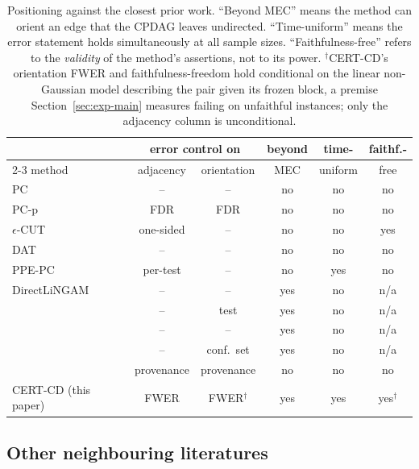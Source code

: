 \documentclass[pdflatex,sn-apa]{sn-jnl}
\theoremstyle{thmstyleone}%
\theoremstyle{thmstyletwo}%
\theoremstyle{thmstylethree}%
\begin{document}
\begin{table}[t]
\centering
\caption{Positioning against the closest prior work. ``Beyond MEC'' means the
method can orient an edge that the CPDAG leaves undirected. ``Time-uniform'' means the
error statement holds simultaneously at all sample sizes.
``Faithfulness-free'' refers to the \emph{validity} of the method's
assertions, not to its power. $^\dagger$CERT-CD's orientation FWER and
faithfulness-freedom hold conditional on the linear non-Gaussian model
describing the pair given its frozen block, a premise Section~\ref{sec:exp-main}
measures failing on unfaithful instances; only the adjacency
column is unconditional.}\label{tab:related}
\footnotesize
\begin{tabular}{@{}lccccc@{}}
\toprule
& \multicolumn{2}{c}{error control on} & beyond & time- & faithf.- \\
\cmidrule(lr){2-3}
method & adjacency & orientation & MEC & uniform & free \\
\midrule
PC \citep{spirtes2000causation}      & --  & --  & no  & no  & no  \\
PC-p \citep{strobl2019estimating}    & FDR & FDR & no  & no  & no  \\
$\epsilon$-CUT \citep{shaska2025causal} & one-sided & -- & no & no & yes \\
DAT \citep{amin2024scalable}         & --  & --  & no  & no  & no  \\
PPE-PC \citep{csillag2025prediction} & per-test & -- & no & yes & no \\
DirectLiNGAM \citep{shimizu2011directlingam} & -- & -- & yes & no & n/a \\
\citet{shimizu2008use}               & --  & test & yes & no  & n/a \\
\citet{ruiz2022sequentially}         & --  & --  & yes & no  & n/a \\
\citet{strieder2023confidence}       & --  & conf.\ set & yes & no & n/a \\
\citet{uehara2026iterative}          & provenance & provenance & no & no & no \\
\midrule
CERT-CD (this paper)                 & FWER & FWER$^\dagger$ & yes & yes & yes$^\dagger$ \\
\bottomrule
\end{tabular}
\end{table}

\subsection{Other neighbouring literatures}\label{sec:neighbours}
\end{document}
